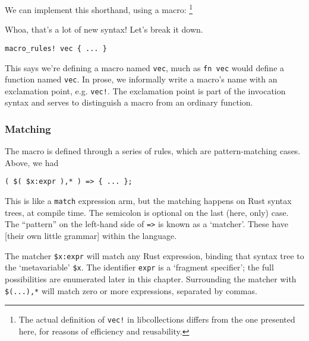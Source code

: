 \documentclass[a4paper,]{book}
\newenvironment{Shaded}{\begin{snugshade}}{\end{snugshade}}
\newcommand{\KeywordTok}[1]{\textcolor[rgb]{0.13,0.29,0.53}{\textbf{{#1}}}}
\newcommand{\DataTypeTok}[1]{\textcolor[rgb]{0.13,0.29,0.53}{{#1}}}
\newcommand{\PreprocessorTok}[1]{\textcolor[rgb]{0.56,0.35,0.01}{\textit{{#1}}}}
\newcommand{\NormalTok}[1]{{#1}}
\begin{document}
We can implement this shorthand, using a macro: \footnote{The actual
  definition of \texttt{vec!} in libcollections differs from the one
  presented here, for reasons of efficiency and reusability.}

\begin{Shaded}
\end{Shaded}

Whoa, that's a lot of new syntax! Let's break it down.

\begin{verbatim}
macro_rules! vec { ... }
\end{verbatim}

This says we're defining a macro named \texttt{vec}, much as
\texttt{fn\ vec} would define a function named \texttt{vec}. In prose,
we informally write a macro's name with an exclamation point, e.g.
\texttt{vec!}. The exclamation point is part of the invocation syntax
and serves to distinguish a macro from an ordinary function.

\subsubsection{Matching}\label{matching}

The macro is defined through a series of rules, which are
pattern-matching cases. Above, we had

\begin{verbatim}
( $( $x:expr ),* ) => { ... };
\end{verbatim}

This is like a \texttt{match} expression arm, but the matching happens
on Rust syntax trees, at compile time. The semicolon is optional on the
last (here, only) case. The ``pattern'' on the left-hand side of
\texttt{=\textgreater{}} is known as a `matcher'. These have {[}their
own little grammar{]} within the language.

The matcher \texttt{\$x:expr} will match any Rust expression, binding
that syntax tree to the `metavariable' \texttt{\$x}. The identifier
\texttt{expr} is a `fragment specifier'; the full possibilities are
enumerated later in this chapter. Surrounding the matcher with
\texttt{\$(...),*} will match zero or more expressions, separated by
commas.
\end{document}
